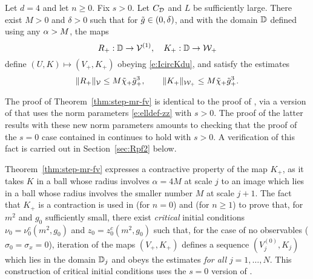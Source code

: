 \begin{theorem}
\label{thm:step-mr-fv}
Let $d = 4$ and let $n \ge 0$. Fix $s > 0$.
Let $C_{\mathcal{D}}$ and $L$ be sufficiently large.
There exist $M>0$ and $\delta >0$ such that
for $\tilde{g} \in (0,\delta)$, %
and with the domain
$\mathbb{D}$ defined using any $\alpha> M$, the maps
\begin{equation}
\label{e:RKplusmaps}
R_+:\domRG %
\to \Vcal^{(1)},
\quad
K_+:\domRG %
\to \Wcal_{+}%
\end{equation}
define $(U,K)\mapsto (V_+,K_+)$ obeying \eqref{e:IcircKdu},
and satisfy the estimates
\begin{equation}
\label{e:RKplus}
\|R_+\|_{\mathcal{V}}
\le
M\tilde{\chi}_+\tilde{g}_+^{3}
, \qquad
\|K_+\|_{\mathcal{W}_+}
\le
M\tilde{\chi}_+ \tilde{g}_+^{3}
.
\end{equation}
\end{theorem}

The proof of Theorem~\ref{thm:step-mr-fv} is identical to the proof of
\cite[Theorem~\ref{phi4-thm:step-mr-fv}]{ST-phi4}, via a version of
\cite[Theorems~\ref{step-thm:mr-R}--\ref{step-thm:mr}]{BS-rg-step} that
uses the norm parameters \eqref{e:elldef-zz} with $s > 0$.
The proof of the latter results with these new norm parameters amounts to
checking that the proof of the $s = 0$ case contained in \cite{BS-rg-IE,BS-rg-step}
continues to hold with $s > 0$. A verification of this fact is carried
out in Section~\ref{sec:Rpf2} below.

Theorem~\ref{thm:step-mr-fv} expresses a contractive property of the map $K_+$,
as it takes $K$ in a ball whose radius involves $\alpha=4M$ at scale $j$ to
an image which lies in a ball whose radius involves the smaller number $M$ at scale
$j+1$.  The fact that $K_+$ is a contraction is used
in \cite[Proposition~\ref{log-prop:KjNbd}]{BBS-saw4-log} (for $n=0$) and
\cite[Theorem~\ref{phi4-log-thm:flow-flow}]{BBS-phi4-log}
(for $n \ge 1$) to prove that, for $m^2$ and
$g_0$ sufficiently small, there exist \emph{critical} initial conditions
$\nu_0 = \nu_0^c(m^2, g_0)$ and $z_0 = z_0^c(m^2, g_0)$ such that,
for the case of no observables ($\sigma_0=\sigma_x=0$), iteration of
the maps $(V_+,K_+)$ defines a
sequence $(V_j^{(0)}, K_j)$ which lies
in the domain $\mathbb{D}_j$ and obeys the estimates 
\emph{for all} $j = 1, \ldots, N$.
This construction of critical initial conditions uses the $s=0$ version
of .

